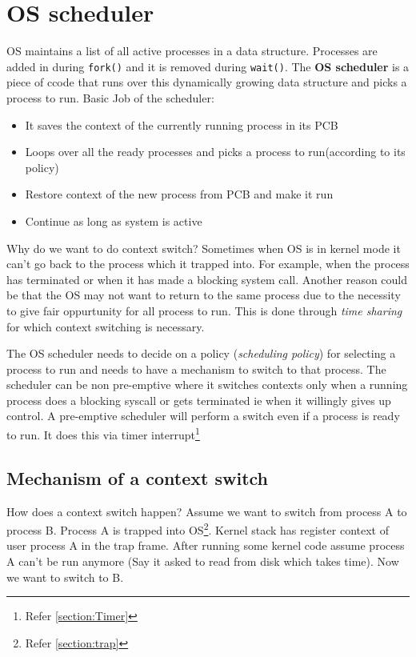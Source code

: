 \documentclass[12pt]{article}
\begin{document}
\section{OS scheduler}

OS maintains a list of all active processes in a data structure. Processes are added in during \texttt{fork()} and it is removed during \texttt{wait()}.
The \textbf{OS scheduler} is a piece of ccode that runs over this dynamically growing data structure and picks a process to run.
Basic Job of the scheduler:
\begin{itemize}[topsep=0pt, partopsep=0pt, itemsep=0pt, parsep=0pt]
    \item It saves the context of the currently running process in its PCB
    \item Loops over all the ready processes and picks a process to run(according to its policy)
    \item Restore context of the new process from PCB and make it run
    \item Continue as long as system is active
\end{itemize}

Why do we want to do context switch?
Sometimes when OS is in kernel mode it can't go back to the process which it trapped into. For example, when the process has terminated or when it has made a blocking system call.
Another reason could be that the OS may not want to return to the same process due to the necessity to give fair oppurtunity for all process to run. This is done through \textit{time sharing} for which context switching is necessary.

The OS scheduler needs to decide on a policy (\textit{scheduling policy}) for selecting a process to run and needs to have a mechanism to switch to that process. The scheduler can be non pre-emptive where it switches contexts only
 when a running process does a blocking syscall or gets terminated ie when it willingly gives up control. A pre-emptive scheduler will perform a switch even if a process is ready to run. It does this via timer interrupt\footnote{Refer \ref{section:Timer}}



\subsection{Mechanism of a context switch}
 How does a context switch happen? Assume we want to switch from process A to process B. Process A is trapped into OS\footnote{Refer \ref{section:trap}}. Kernel stack has register context of user process A in the trap frame.
 After running some kernel code assume process A can't be run anymore (Say it asked to read from disk which takes time). Now we want to switch to B. 
\end{document}
